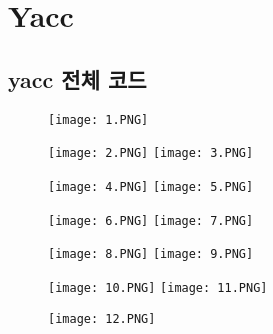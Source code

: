 \documentclass{article}
\begin{document}
\section{Yacc}
\subsection{yacc 전체 코드}
\begin{figure}[h]
\centering 
\texttt{[image: 1.PNG]} 
\end{figure}
\begin{figure}
\texttt{[image: 2.PNG]}  
\texttt{[image: 3.PNG]} 
\end{figure}
\begin{figure} [h]
\centering 
\texttt{[image: 4.PNG]}  
\texttt{[image: 5.PNG]}
\end{figure}
\begin{figure} [h]
\centering  
\texttt{[image: 6.PNG]}  
\texttt{[image: 7.PNG]} 
\end{figure}
\begin{figure} [h]
\centering 
\texttt{[image: 8.PNG]}  
\texttt{[image: 9.PNG]} 
\end{figure}
\begin{figure} [h]
\centering 
\texttt{[image: 10.PNG]}  
\texttt{[image: 11.PNG]} 
\end{figure}
\begin{figure} [h]
\centering 
\texttt{[image: 12.PNG]}  
\end{figure}
\end{document}
